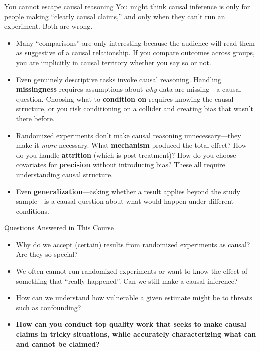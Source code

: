 \documentclass[xcolor=dvipsnames]{beamer}
\newcommand\makebiggaps{\addtolength{\itemsep}{.5\baselineskip}}
\begin{document}
\begin{frame}{You cannot escape causal reasoning}
\footnotesize
{} You might think causal inference is only for people making ``clearly causal claims,'' and only when they can't run an experiment. Both are wrong.\\
\medskip
\begin{itemize}
\item<2-> Many ``comparisons'' are only interesting because the audience will read them as suggestive of a causal relationship. If you compare outcomes across groups, you are implicitly in causal territory whether you say so or not.
\medskip
\item<3-> Even genuinely descriptive tasks invoke causal reasoning. Handling \textbf{missingness} requires assumptions about \textit{why} data are missing---a causal question. Choosing what to \textbf{condition on} requires knowing the causal structure, or you risk conditioning on a collider and creating bias that wasn't there before.
\medskip
\item<4-> Randomized experiments don't make causal reasoning unnecessary---they make it \textit{more} necessary. What \textbf{mechanism} produced the total effect? How do you handle \textbf{attrition} (which is post-treatment)? How do you choose covariates for \textbf{precision} without introducing bias? These all require understanding causal structure.
\medskip
\item<5-> Even \textbf{generalization}---asking whether a result applies beyond the study sample---is a causal question about what would happen under different conditions.
\end{itemize}
\end{frame}

\begin{frame}{Questions Answered in This Course}
\begin{itemize}
\makebiggaps

\item<1-> Why do we accept (certain) results from randomized experiments as causal? Are they so special?

\item<2-> We often cannot run randomized experiments or want to know the effect of something that ``really happened''. Can we still make a causal inference?

\item<3-> How can we understand how vulnerable a given estimate might be to threats such as confounding?

\item<4-> \textbf{How can you conduct top quality work that seeks to make causal claims in tricky situations, while accurately characterizing what can and cannot be claimed?}
\end{itemize}
\end{frame}
\end{document}

